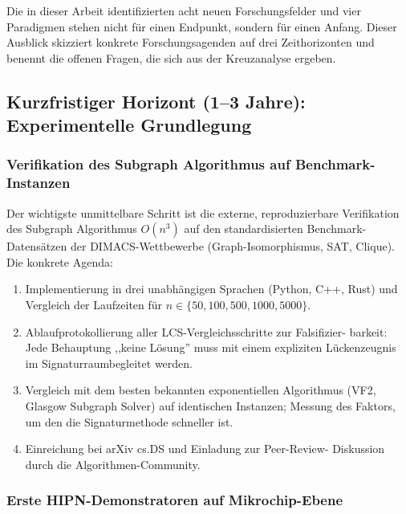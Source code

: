 ﻿\documentclass[a4paper,12pt]{scrreprt}
\theoremstyle{definition}
\begin{document}
Die in dieser Arbeit identifizierten acht neuen Forschungsfelder und vier
Paradigmen stehen nicht für einen Endpunkt, sondern für einen Anfang.
Dieser Ausblick skizziert konkrete Forschungsagenden auf drei Zeithorizonten
und benennt die offenen Fragen, die sich aus der Kreuzanalyse ergeben.

\subsection{Kurzfristiger Horizont (1--3 Jahre): Experimentelle Grundlegung}

\subsubsection{Verifikation des Subgraph Algorithmus auf Benchmark-Instanzen}

Der wichtigste unmittelbare Schritt ist die externe, reproduzierbare
Verifikation des Subgraph Algorithmus $O(n^3)$ auf den standardisierten
Benchmark-Datensätzen der DIMACS-Wettbewerbe (Graph-Isomorphismus, SAT,
Clique). Die konkrete Agenda:
\begin{enumerate}
  \item Implementierung in drei unabhängigen Sprachen (Python, C++, Rust)
    und Vergleich der Laufzeiten für $n \in \{50, 100, 500, 1000, 5000\}$.
  \item Ablaufprotokollierung aller LCS-Vergleichsschritte zur Falsifizier-
    barkeit: Jede Behauptung ,,keine Lösung'' muss mit einem expliziten
    Lückenzeugnis im Signaturraumbegleitet werden.
  \item Vergleich mit dem besten bekannten exponentiellen Algorithmus
    (VF2, Glasgow Subgraph Solver) auf identischen Instanzen; Messung
    des Faktors, um den die Signaturmethode schneller ist.
  \item Einreichung bei arXiv cs.DS und Einladung zur Peer-Review-
    Diskussion durch die Algorithmen-Community.
\end{enumerate}

\subsubsection{Erste HIPN-Demonstratoren auf Mikrochip-Ebene}
\end{document}
